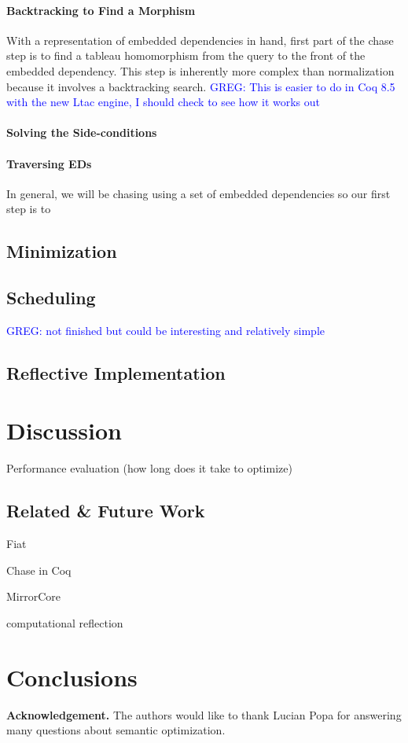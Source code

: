 \documentclass[preprint]{sigplanconf}
\newcommand{\greg}[1]{\textcolor{blue}{GREG: #1}}
\begin{document}
\paragraph{Backtracking to Find a Morphism}
With a representation of embedded dependencies in hand, first part of the chase step is to find a tableau homomorphism from the query to the front of the embedded dependency.
This step is inherently more complex than normalization because it involves a backtracking search.
\greg{This is easier to do in Coq 8.5 with the new Ltac engine, I should check to see how it works out}



\paragraph{Solving the Side-conditions}


\paragraph{Traversing EDs}
In general, we will be chasing using a set of embedded dependencies so our first step is to 



\subsection{Minimization}

\subsection{Scheduling}
\greg{not finished but could be interesting and relatively simple}


\subsection{Reflective Implementation}

\section{Discussion}

Performance evaluation (how long does it take to optimize)

\subsection{Related \& Future Work}
Fiat~\cite{deleware2015fiat}

Chase in Coq~\cite{}

MirrorCore~\cite{malecha2014thesis}

computational reflection~\cite{}

\section{Conclusions}




{\bf Acknowledgement.}  The authors would like to thank Lucian Popa for answering many questions about semantic optimization.



\end{document}
